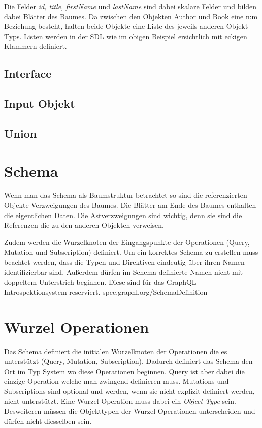 Die Felder \textit{id, title, firstName} und \textit{lastName} sind dabei skalare Felder und bilden dabei Blätter des Baumes.
Da zwischen den Objekten Author und Book eine n:m Beziehung besteht, halten beide Objekte eine Liste des jeweils anderen Objekt-Typs.
Listen werden in der SDL wie im obigen Beispiel ersichtlich mit eckigen Klammern definiert.

\subsection{Interface}


\subsection{Input Objekt}


\subsection{Union}

\section{Schema}
Wenn man das Schema als Baumstruktur betrachtet so sind die referenzierten Objekte Verzweigungen des Baumes.
Die Blätter am Ende des Baumes enthalten die eigentlichen Daten.
Die Astverzweigungen sind wichtig, denn sie sind die Referenzen die zu den anderen Objekten verweisen.

Zudem werden die Wurzelknoten der Eingangspunkte der Operationen (Query, Mutation und Subscription) definiert.
Um ein korrektes Schema zu erstellen muss beachtet werden, dass die Typen und Direktiven eindeutig über ihren Namen identifizierbar sind. Außerdem dürfen im Schema definierte Namen nicht mit doppeltem Unterstrich beginnen.
Diese sind für das GraphQL Introspektionsystem reserviert. spec.graphl.org/SchemaDefinition

\section{Wurzel Operationen}
Das Schema definiert die initialen Wurzelknoten der Operationen die es unterstützt (Query, Mutation, Subscription). Dadurch definiert das Schema den Ort im Typ System wo diese Operationen beginnen.
Query ist aber dabei die einzige Operation welche man zwingend definieren muss. Mutations und Subscriptions sind optional und werden, wenn sie nicht explizit definiert werden, nicht unterstützt.
Eine Wurzel-Operation muss dabei ein \textit{Object Type} sein. Desweiteren müssen die Objekttypen der Wurzel-Operationen unterscheiden und dürfen nicht diesselben sein. 


